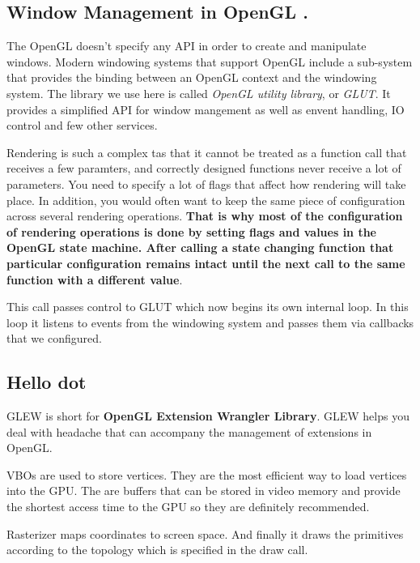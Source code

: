 \subsection{Window Management in OpenGL .}
The OpenGL doesn't specify any API in order to create and manipulate windows. Modern windowing systems that support OpenGL include a sub-system that provides the binding between an OpenGL context and the windowing system. The library we use here is called \textit{OpenGL utility library}, or \textit{GLUT}. It provides a simplified API for window mangement as well 
as envent handling, IO control and few other services.

Rendering is such a complex tas that it cannot be treated as a function call that receives a few paramters,
and correctly designed functions never receive a lot of parameters. You need to specify a lot of flags that affect
how rendering will take place. In addition, you would often want to keep the same piece of configuration across 
several rendering operations.  \textbf{That is why most of the configuration of rendering operations is done by setting
flags and values in the OpenGL state machine. After calling a state changing function that particular configuration
remains intact until the next call to the same function with a different value}.

This call passes control to GLUT which now begins its own internal loop. In this loop it listens to events from 
the windowing system and passes them via callbacks that we configured.

\subsection{Hello dot}
 GLEW is short for \textbf{OpenGL Extension Wrangler Library}. GLEW helps you deal with
headache that can accompany the management of extensions in OpenGL.
			
 VBOs are used to store vertices. They are the most efficient
way to load vertices into the GPU. The are buffers that can be stored in video memory and provide
the shortest access time to the GPU so they are definitely recommended.

 Rasterizer maps coordinates to screen space. And finally it draws the
primitives according to the topology which is specified in the draw call.


